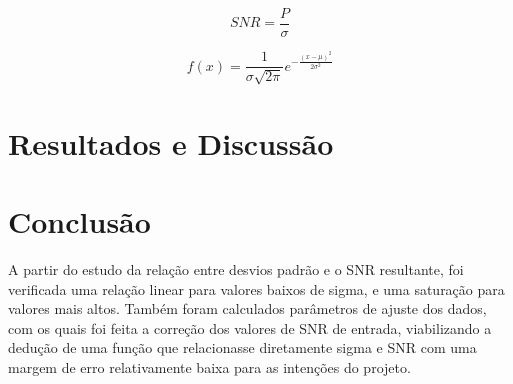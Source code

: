 \documentclass{article}
\begin{document}
\begin{equation} \label{eq:2}
    SNR = \frac{P}{\sigma}
\end{equation}

\begin{equation} \label{eq:3}
    f(x) = \frac{1}{\sigma \sqrt{2\pi}}e^{-\frac{(x - \mu)^2}{2\sigma ^2}}
\end{equation}

\section{Resultados e Discussão}

\section{Conclusão}

A partir do estudo da relação entre desvios padrão e o SNR resultante, 
foi verificada uma relação linear para valores baixos de sigma, e uma 
saturação para valores mais altos. Também foram calculados 
parâmetros de ajuste dos dados, com os quais foi feita a correção dos 
valores de SNR de entrada, viabilizando a dedução de uma função que 
relacionasse diretamente sigma e SNR com uma margem de erro 
relativamente baixa para as intenções do projeto.






\end{document}
